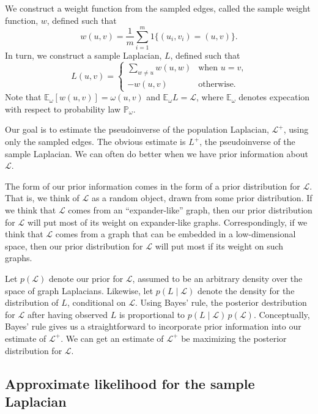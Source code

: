 \documentclass[12pt]{article}
\newcommand{\prob}{\mathbb{P}}
\newcommand{\E}{\mathbb{E}}
\theoremstyle{plain}
\begin{document}
We construct a weight function from the sampled edges, called the
sample weight function, $w$, defined such that
\[
  w(u,v) = \frac{1}{m} \sum_{i=1}^{m} 1\{ (u_i, v_i) = (u,v) \}.
\]
In turn, we construct a sample Laplacian, $L$, defined such that
\[
  L(u,v)
    =
    \begin{cases}
      \sum_{w \neq u} w(u,w) &\text{when $u = v$,} \\
      -w(u,v) &\text{otherwise.}
    \end{cases}
\]
Note that $\E_\omega[w(u,v)] = \omega(u,v)$ and $\E_\omega L =
\mathcal{L}$, where $\E_\omega$ denotes expecation with respect to
probability law $\prob_\omega$.

Our goal is to estimate the pseudoinverse of the population Laplacian,
$\mathcal{L}^{+}$, using only the sampled edges.  The obvious estimate
is $L^{+}$, the pseudoinverse of the sample Laplacian.  We can often
do better when we have prior information about $\mathcal{L}$.

The form of our prior information comes in the form of a prior distribution
for $\mathcal{L}$.  That is, we think of $\mathcal{L}$ as a random
object, drawn from some prior distribution.  If we think that
$\mathcal{L}$ comes from an ``expander-like'' graph, then our prior
distribution for $\mathcal{L}$ will put most of its weight on
expander-like graphs.  Correspondingly, if we think that $\mathcal{L}$
comes from a graph that can be embedded in a low-dimensional space,
then our prior distribution for $\mathcal{L}$ will put most if its
weight on such graphs.

Let $p(\mathcal{L})$ denote our prior for $\mathcal{L}$, assumed to be
an arbitrary density over the space of graph Laplacians.  Likewise, let
$p(L \mid \mathcal{L})$ denote the density for the
distribution of $L$, conditional on $\mathcal{L}$.  Using Bayes' rule,
the posterior destribution for $\mathcal{L}$ after having observed $L$
is proportional to $p(L \mid \mathcal{L}) \, p(\mathcal{L})$.
Conceptually, Bayes' rule gives us a straightforward to
incorporate prior information into our estimate of $\mathcal{L}^+$.
We can get an estimate of $\mathcal{L}^{+}$ be maximizing the
posterior distribution for $\mathcal{L}$.

\subsection{Approximate likelihood for the sample Laplacian}
\end{document}
